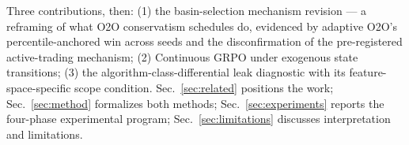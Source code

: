 Three contributions, then: (1) the basin-selection mechanism revision
--- a reframing of what O2O conservatism schedules do, evidenced by
adaptive O2O's percentile-anchored win across seeds and the
disconfirmation of the pre-registered active-trading mechanism;
(2) Continuous GRPO under exogenous state transitions; (3) the
algorithm-class-differential leak diagnostic with its
feature-space-specific scope condition. Sec.~\ref{sec:related}
positions the work; Sec.~\ref{sec:method} formalizes both methods;
Sec.~\ref{sec:experiments} reports the four-phase experimental
program; Sec.~\ref{sec:limitations} discusses interpretation and
limitations.
